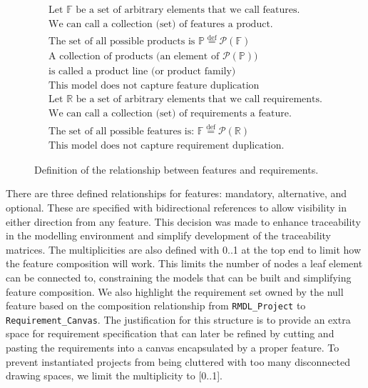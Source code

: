 \begin{figure}
	\begin{align}
		\text{Let } \mathbb{F} \text{ be a set of arbitrary elements that we call features.}\\
		\text{We can call a collection (set) of features a product.}\\
		\text{The set of all possible products is } \mathbb{P} \overset{\mathrm{def}}{=} \mathcal{P}(\mathbb{F})\\
		\text{A collection of products (an element of } \mathcal{P}(\mathbb{P})\text{)}\\
		\text{is called a product line (or product family)}\\
		\text{This model does not capture feature duplication}\\
		\text{Let } \mathbb{R} \text{ be a set of arbitrary elements that we call requirements.}\\
		\text{We can call a collection (set) of requirements a feature.}\\
		\text{The set of all possible features is: } \mathbb{F} \overset{\mathrm{def}}{=} \mathcal{P}(\mathbb{R})\\
		\text{This model does not capture requirement duplication.}
	\end{align}
	\caption{Definition of the relationship between features and requirements.}
	\label{fig:spec}
\end{figure}

There are three defined relationships for features: mandatory, alternative, and optional. These are specified with bidirectional references to allow visibility in either direction from any feature. This decision was made to enhance traceability in the modelling environment and simplify development of the traceability matrices. The multiplicities are also defined with 0..1 at the top end to limit how the feature composition will work. This limits the number of nodes a leaf element can be connected to, constraining the models that can be built and simplifying feature composition. We also highlight the requirement set owned by the null feature based on the composition relationship from \texttt{RMDL\_Project} to \texttt{Requirement\_Canvas}. The justification for this structure is to provide an extra space for requirement specification that can later be refined by cutting and pasting the  requirements into a canvas encapsulated by a proper feature. To prevent instantiated projects from being cluttered with too many disconnected drawing spaces, we limit the multiplicity to [0..1].

